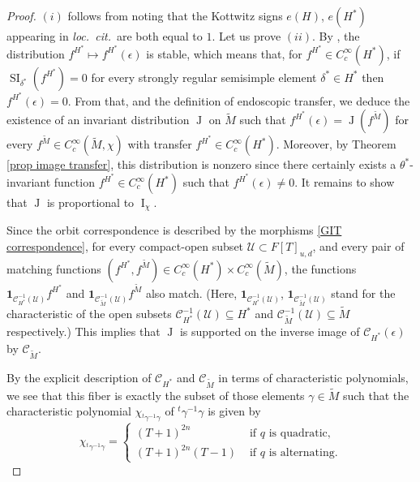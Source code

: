 \documentclass[12pt]{article}
\numberwithin{equation}{section}
\def\tM{\widetilde{M}}
\DeclareMathOperator{\SI}{\mathrm{SI}}
\DeclareMathOperator{\rI}{\mathrm{I}}
\DeclareMathOperator{\rJ}{\mathrm{J}}
\begin{document}
	\begin{proof}
		$(i)$ follows from \cite[Proposition 2]{KottTam} noting that the Kottwitz signs $e(H)$, $e(H^*)$ appearing in {\em loc.\ cit.}\ are both equal to $1$.
		Let us prove $(ii)$. By \cite[Proposition 1]{KottTam}, the distribution $f^{H^*}\mapsto f^{H^*}(\epsilon)$ is stable, which means that, for $f^{H^*}\in C_c^\infty(H^*)$, if $\SI_{\delta^*}(f^{H^*})=0$ for every strongly regular semisimple element $\delta^*\in H^*$ then $f^{H^*}(\epsilon)=0$. From that, and the definition of endoscopic transfer, we deduce the existence of an invariant distribution $\rJ$ on $\tM$ such that $f^{H^*}(\epsilon)=\rJ(f^{\tM})$ for every $f^{\tilde{M}}\in C_c^\infty(\tilde{M},\chi)$ with transfer $f^{H^*}\in C_c^\infty(H^*)$. Moreover, by Theorem \ref{prop image transfer}, this distribution is nonzero since there certainly exists a $\theta^*$-invariant function $f^{H^*}\in C_c^\infty(H^*)$ such that $f^{H^*}(\epsilon)\neq 0$. It remains to show that $\rJ$ is proportional to $\rI_{\chi}$.
		
		Since the orbit correspondence is described by the morphisms \eqref{GIT correspondence}, for every compact-open subset $\mathcal{U}\subset F[T]_{u,d}$, and every pair of matching functions $(f^{H^*},f^{\tM})\in C_c^\infty(H^*)\times C_c^\infty(\tM)$, the functions $\mathbf{1}_{\mathcal{C}_{H^*}^{-1}(\mathcal{U})} f^{H^*}$ and $\mathbf{1}_{\mathcal{C}_{\tM}^{-1}(\mathcal{U})} f^{\tM}$ also match. (Here, $\mathbf{1}_{\mathcal{C}_{H^*}^{-1}(\mathcal{U})}$, $\mathbf{1}_{\mathcal{C}_{\tM}^{-1}(\mathcal{U})}$ stand for the characteristic of the open subsets $\mathcal{C}_{H^*}^{-1}(\mathcal{U})\subseteq H^*$ and $\mathcal{C}_{\tM}^{-1}(\mathcal{U})\subseteq \tM$ respectively.) This implies that $\rJ$ is supported on the inverse image of $\mathcal{C}_{H^*}(\epsilon)$ by $\mathcal{C}_{\tM}$.
		
		By the explicit description of $\mathcal{C}_{H^*}$ and $\mathcal{C}_{\tM}$ in terms of characteristic polynomials, we see that this fiber is exactly the subset of those elements $\gamma\in \tM$ such that the characteristic polynomial $\chi_{{}^t \gamma^{-1}\gamma}$ of ${}^t \gamma^{-1}\gamma$ is given by
		\begin{equation}\label{eq polchar2}
			\displaystyle \chi_{{}^t \gamma^{-1}\gamma}=\left\{\begin{array}{ll}
				(T+1)^{2n} & \mbox{ if } q \mbox{ is quadratic,} \\
				(T+1)^{2n}(T-1) & \mbox{ if } q \mbox{ is alternating.}
			\end{array}
			\right.
		\end{equation}
		

\end{proof}
\end{document}
